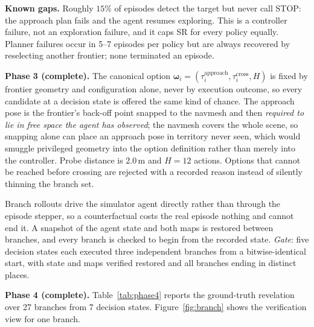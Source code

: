 \documentclass[10pt,twocolumn]{article}
\newcommand{\Option}{\boldsymbol{\omega}}
\begin{document}
\textbf{Known gaps.} Roughly \(15\%\) of episodes detect the target but never
call STOP: the approach plan fails and the agent resumes exploring. This is a
controller failure, not an exploration failure, and it caps SR for every
policy equally. Planner failures occur in 5--7 episodes per policy but are
always recovered by reselecting another frontier; none terminated an episode.

\textbf{Phase 3 (complete).} The canonical option
\(\Option_i=(\tau_i^{\mathrm{approach}},\tau_i^{\mathrm{cross}},H)\) is fixed
by frontier geometry and configuration alone, never by execution outcome, so
every candidate at a decision state is offered the same kind of chance. The
approach pose is the frontier's back-off point snapped to the navmesh and then
\emph{required to lie in free space the agent has observed}; the navmesh covers
the whole scene, so snapping alone can place an approach pose in territory
never seen, which would smuggle privileged geometry into the option definition
rather than merely into the controller. Probe distance is \(2.0\,\mathrm{m}\)
and \(H=12\) actions. Options that cannot be reached before crossing are
rejected with a recorded reason instead of silently thinning the branch set.

Branch rollouts drive the simulator agent directly rather than through the
episode stepper, so a counterfactual costs the real episode nothing and cannot
end it. A snapshot of the agent state and both maps is restored between
branches, and every branch is checked to begin from the recorded state.
\emph{Gate}: five decision states each executed three independent branches from
a bitwise-identical start, with state and maps verified restored and all
branches ending in distinct places.

\textbf{Phase 4 (complete).} Table~\ref{tab:phase4} reports the ground-truth
revelation over 27 branches from 7 decision states.
Figure~\ref{fig:branch} shows the verification view for one branch.
\end{document}
